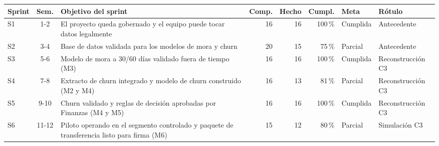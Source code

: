 \footnotesize
\begin{tabularx}{\linewidth}{l c X r r r l l}
\toprule
\textbf{Sprint} & \textbf{Sem.} & \textbf{Objetivo del sprint} & \textbf{Comp.} & \textbf{Hecho} & \textbf{Cumpl.} & \textbf{Meta} & \textbf{Rótulo} \\
\midrule
S1 & 1-2 & El proyecto queda gobernado y el equipo puede tocar datos legalmente & 16 & 16 & 100\,\% & Cumplida & Antecedente \\
S2 & 3-4 & Base de datos validada para los modelos de mora y churn & 20 & 15 & 75\,\% & Parcial & Antecedente \\
S3 & 5-6 & Modelo de mora a 30/60 días validado fuera de tiempo (M3) & 16 & 16 & 100\,\% & Cumplida & Reconstrucción C3 \\
S4 & 7-8 & Extracto de churn integrado y modelo de churn construido (M2 y M4) & 16 & 13 & 81\,\% & Parcial & Reconstrucción C3 \\
S5 & 9-10 & Churn validado y reglas de decisión aprobadas por Finanzas (M4 y M5) & 16 & 16 & 100\,\% & Cumplida & Reconstrucción C3 \\
S6 & 11-12 & Piloto operando en el segmento controlado y paquete de transferencia listo para firma (M6) & 15 & 12 & 80\,\% & Parcial & Simulación C3 \\
\bottomrule
\end{tabularx}
